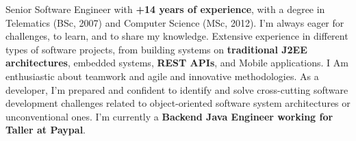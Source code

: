  Senior Software Engineer with \textbf{+14 years of experience}, with a degree in Telematics (BSc, 2007) and Computer Science (MSc, 2012). I'm always eager for challenges, to learn, and to share my knowledge. Extensive experience in different types of software projects, from building systems on \textbf{traditional J2EE architectures}, embedded systems, \textbf{REST APIs}, and Mobile applications. I Am enthusiastic about teamwork and agile and innovative methodologies. As a developer, I'm prepared and confident to identify and solve cross-cutting software development challenges related to object-oriented software system architectures or unconventional ones. I'm currently a \textbf{Backend Java Engineer working for Taller at Paypal}.





